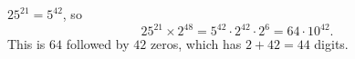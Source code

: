 $25^{21}=5^{42}$, so
\[
25^{21}\times2^{48}=5^{42}\cdot2^{42}\cdot2^{6}=64\cdot10^{42}.
\]
This is $64$ followed by $42$ zeros, which has $2+42=\boxed{44}$ digits.

